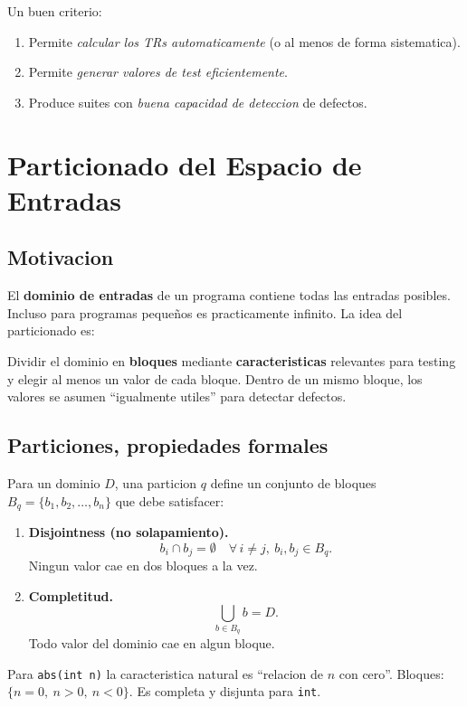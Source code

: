 \documentclass[12pt,a4paper]{article}
\begin{document}
Un buen criterio:
\begin{enumerate}
  \item Permite \emph{calcular los TRs automaticamente} (o al menos de forma sistematica).
  \item Permite \emph{generar valores de test eficientemente}.
  \item Produce suites con \emph{buena capacidad de deteccion} de defectos.
\end{enumerate}

\section{Particionado del Espacio de Entradas}

\subsection{Motivacion}

El \textbf{dominio de entradas} de un programa contiene todas las entradas posibles. Incluso para
programas pequeños es practicamente infinito. La idea del particionado es:

\begin{ideabox}
Dividir el dominio en \textbf{bloques} mediante \textbf{caracteristicas} relevantes para testing y
elegir al menos un valor de cada bloque. Dentro de un mismo bloque, los valores se asumen
``igualmente utiles'' para detectar defectos.
\end{ideabox}

\subsection{Particiones, propiedades formales}

Para un dominio \(D\), una particion \(q\) define un conjunto de bloques
\(B_q = \{b_1, b_2, \ldots, b_n\}\) que debe satisfacer:

\begin{enumerate}
  \item \textbf{Disjointness (no solapamiento).}
  \[
  b_i \cap b_j = \emptyset \quad \forall\, i \neq j,\ b_i, b_j \in B_q.
  \]
  Ningun valor cae en dos bloques a la vez.

  \item \textbf{Completitud.}
  \[
  \bigcup_{b \in B_q} b = D.
  \]
  Todo valor del dominio cae en algun bloque.
\end{enumerate}

\begin{ejemplobox}
Para \texttt{abs(int n)} la caracteristica natural es ``relacion de \(n\) con cero''. Bloques:
\(\{n = 0,\ n > 0,\ n < 0\}\). Es completa y disjunta para \texttt{int}.
\end{ejemplobox}
\end{document}
